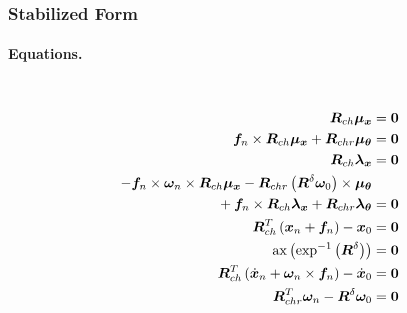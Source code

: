 \documentclass[10pt,dvips,fleqn,subeqn]{report}
\newcommand{\T}[1]{\bm{#1}}
\newcommand{\TT}[1]{\bm{#1}}
\begin{document}
\subsubsection{Stabilized Form}
\paragraph{Equations.} \
\begin{subequations}
\begin{align}
	\TT{R}_{ch} \T{\mu}_{\T{x}} &= \T{0} \\
%
	\T{f}_n \times \TT{R}_{ch} \T{\mu}_{\T{x}} + \TT{R}_{chr} \T{\mu}_{\T{\theta}} &= \T{0} \\
%
	\TT{R}_{ch} \T{\lambda}_{\T{x}} &= \T{0} \\
%
	-\T{f}_n \times \T{\omega}_n \times \TT{R}_{ch} \T{\mu}_{\T{x}}
	- \TT{R}_{chr} \plbr{\TT{R}^{\delta} \T{\omega}_0} \times \T{\mu}_{\T{\theta}} & \nonumber \\
	\mbox{} + \T{f}_n \times \TT{R}_{ch} \T{\lambda}_{\T{x}} + \TT{R}_{chr} \T{\lambda}_{\T{\theta}} &= \T{0} \\
%
	\TT{R}_{ch}^T\plbr{\T{x}_n + \T{f}_n} - \T{x}_0 &= \T{0} \\
%
	\mathrm{ax}\plbr{
		\mathrm{exp}^{-1}\plbr{
			\TT{R}^{\delta}
		}
	} &= \T{0} \\
%
	\TT{R}_{ch}^T\plbr{\dot{\T{x}}_n + \T{\omega}_n \times \T{f}_n} -\dot{\T{x}}_0 &= \T{0} \\
%
	\TT{R}_{chr}^T \T{\omega}_n - \TT{R}^{\delta} \T{\omega}_0 &= \T{0}
\end{align}
\end{subequations}
\end{document}
